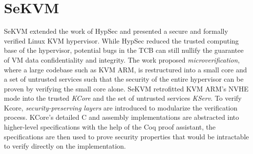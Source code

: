\section{SeKVM}
\label{sec:sekvmintro}

SeKVM extended the work of HypSec and presented a secure and formally verified
Linux KVM hypervisor. While HypSec reduced the trusted computing base of the
hypervisor, potential bugs in the TCB can still nullify the guarantee of VM
data confidentiality and integrity. The work proposed \textit{microverification},
where a large codebase such as KVM ARM, is restructured into a small core and a
set of untrusted services such that the security of the entire hypervisor can
be proven by verifying the small core alone. SeKVM retrofitted KVM ARM's NVHE
mode into the trusted \textit{KCore} and the set of untrusted services
\textit{KServ}.
To verify Kcore, \textit{security-preserving layers} are introduced to
modularize the verification process.
KCore's detailed C and assembly implementations are abstracted into higher-level
specifications with the help of the Coq proof assistant, the specifications are
then used to prove security properties that would be intractable to verify
directly on the implementation.





